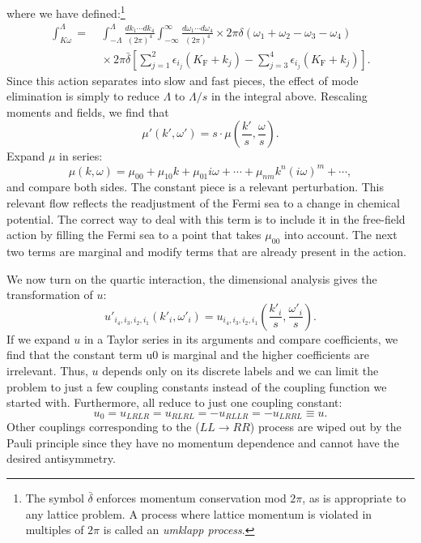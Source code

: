 where we have defined:\footnote{The symbol $\bar\delta$ enforces momentum conservation mod $2\pi$, as is appropriate to any lattice problem. A process where lattice momentum is violated in multiples of $2\pi$ is called an \textit{umklapp process}.}
\begin{equation}
\begin{aligned}
	\int_{K \omega}^{\Lambda}
	=&\ {\int_{-\Lambda}^{\Lambda} \frac{d k_{1} \cdots d k_{4}}{(2 \pi)^{4}} \int_{-\infty}^{\infty} \frac{d \omega_{1} \cdots d \omega_{4}}{(2 \pi)^{4}} \times 2 \pi \delta\left(\omega_{1}+\omega_{2}-\omega_{3}-\omega_{4}\right) } \\
	&\ \times 2 \pi \bar{\delta}\left[
		\sum_{j=1}^2 \epsilon_{i_{j}}\left(K_{\mathrm{F}}+k_{j}\right)-
		\sum_{j=3}^4 \epsilon_{i_{j}}\left(K_{\mathrm{F}}+k_{j}\right)
	\right].
\end{aligned}
\end{equation}
Since this action separates into slow and fast pieces, the effect of mode elimination is simply to reduce $\Lambda$ to $\Lambda/s$ in the integral above. Rescaling moments and fields, we find that
\begin{equation}
	\mu'(k',\omega') = s\cdot\mu\left(\frac{k'}{s}, \frac{\omega}{s}\right).
\end{equation}
Expand $\mu$ in series:
\begin{equation}
	\mu(k, \omega)=\mu_{00}+\mu_{10} k+\mu_{01} i \omega+\cdots+\mu_{n m} k^{n}(i \omega)^{m}+\cdots,
\end{equation}
and compare both sides. The constant piece is a relevant perturbation.
This relevant flow reflects the readjustment of the Fermi sea to a change in chemical potential. 
The correct way to deal with this term is to include it in the free-field action by filling the Fermi sea to a point that takes $\mu_{00}$ into account. 
The next two terms are marginal and modify terms that are already present in the action.

We now turn on the quartic interaction, the dimensional analysis gives the transformation of $u$:
\begin{equation}
	u'_{i_4,i_3,i_2,i_1}(k'_i,\omega'_i) = u_{i_4,i_3,i_2,i_1}\left(\frac{k'_i}{s},\frac{\omega'_i}{s}\right).
\end{equation}
If we expand $u$ in a Taylor series in its arguments and compare coefficients, we find that the constant term u0 is marginal and the higher coefficients are irrelevant. 
Thus, $u$ depends only on its discrete labels and we can limit the problem to just a few coupling constants instead of the coupling function we started with. 
Furthermore, all reduce to just one coupling constant:
\begin{equation}
	u_0 = u_{LRLR} = u_{RLRL} = -u_{RLLR} = -u_{LRRL} \equiv u.
\end{equation}
Other couplings corresponding to the ($LL \rightarrow RR$) process are wiped out by the Pauli principle since they have no momentum dependence and cannot have the desired antisymmetry.

